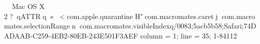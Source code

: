     Mac OS X            	   2  ?     q                                      ATTR      q     e                    <  com.apple.quarantine   H   "  com.macromates.caret   j     com.macromates.selectionRange      n     com.macromates.visibleIndex  q/0083;5acb5b58;Safari;74DADAAB-C259-4EB2-80EB-243E501F3AEF {
    column = 1;
    line = 35;
}1-84112